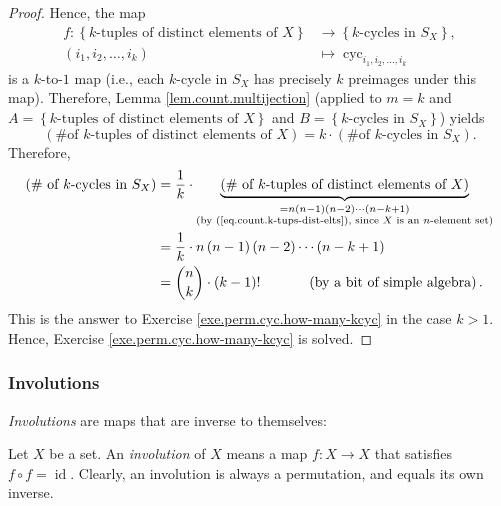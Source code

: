 \begin{proof}
Hence, the map%
\begin{align*}
f:\left\{  k\text{-tuples of distinct elements of }X\right\}   &
\rightarrow\left\{  k\text{-cycles in }S_{X}\right\}  ,\\
\left(  i_{1},i_{2},\ldots,i_{k}\right)   &  \mapsto\operatorname*{cyc}%
\nolimits_{i_{1},i_{2},\ldots,i_{k}}%
\end{align*}
is a $k$-to-$1$ map (i.e., each $k$-cycle in $S_{X}$ has precisely $k$
preimages under this map). Therefore, Lemma \ref{lem.count.multijection}
(applied to $m=k$ and \newline$A=\left\{  k\text{-tuples of distinct elements
of }X\right\}  $ and $B=\left\{  k\text{-cycles in }S_{X}\right\}  $) yields%
\[
\left(  \text{\# of }k\text{-tuples of distinct elements of }X\right)
=k\cdot\left(  \text{\# of }k\text{-cycles in }S_{X}\right)  .
\]
Therefore,
\begin{align*}
\left(  \text{\# of }k\text{-cycles in }S_{X}\right)   &  =\dfrac{1}{k}%
\cdot\underbrace{\left(  \text{\# of }k\text{-tuples of distinct elements of
}X\right)  }_{\substack{=n\left(  n-1\right)  \left(  n-2\right)
\cdots\left(  n-k+1\right)  \\\text{(by (\ref{eq.count.k-tups-dist-elts}),
since }X\text{ is an }n\text{-element set)}}}\\
&  =\dfrac{1}{k}\cdot n\left(  n-1\right)  \left(  n-2\right)  \cdots\left(
n-k+1\right) \\
&  =\dbinom{n}{k}\cdot\left(  k-1\right)  !\ \ \ \ \ \ \ \ \ \ \left(
\text{by a bit of simple algebra}\right)  .
\end{align*}
This is the answer to Exercise \ref{exe.perm.cyc.how-many-kcyc} in the case
$k>1$. Hence, Exercise \ref{exe.perm.cyc.how-many-kcyc} is solved.
\end{proof}

\subsubsection{Involutions}

\emph{Involutions} are maps that are inverse to themselves:

\begin{definition}
\label{def.perm.invol}Let $X$ be a set. An \emph{involution} of $X$ means a
map $f:X\rightarrow X$ that satisfies $f\circ f=\operatorname*{id}$. Clearly,
an involution is always a permutation, and equals its own inverse.
\end{definition}

